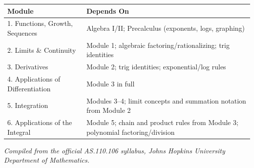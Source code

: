 \documentclass[11pt]{article}
\begin{document}
\begin{center}
\renewcommand{\arraystretch}{1.3}
\begin{longtable}{@{}p{4.3cm}p{9.9cm}@{}}
\toprule
\textbf{Module} & \textbf{Depends On} \\
\midrule
\endhead
1. Functions, Growth, Sequences & Algebra I/II; Precalculus (exponents, logs, graphing) \\
2. Limits \& Continuity & Module 1; algebraic factoring/rationalizing; trig identities \\
3. Derivatives & Module 2; trig identities; exponential/log rules \\
4. Applications of Differentiation & Module 3 in full \\
5. Integration & Modules 3--4; limit concepts and summation notation from Module 2 \\
6. Applications of the Integral & Module 5; chain and product rules from Module 3; polynomial factoring/division \\
\bottomrule
\end{longtable}
\end{center}

\vfill
\begin{center}
\small\textit{Compiled from the official AS.110.106 syllabus, Johns Hopkins University Department of Mathematics.}
\end{center}
\end{document}
